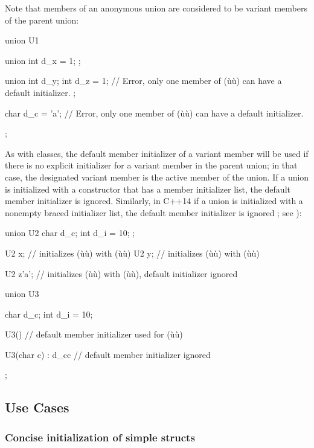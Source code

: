 Note that members of an anonymous union are considered to be variant
members of the parent union:

\begin{emcppslisting}
union U1
{
    union { int d_x = 1; };

    union
    {
        int d_y;
        int d_z = 1;
            // Error, only one member of (ù{}ù) can have a default initializer.
    };

    char d_c = 'a';
        // Error, only one member of (ù{}ù) can have a default initializer.
};
\end{emcppslisting}
    

As with classes, the default member initializer of a variant member will
be used if there is no explicit initializer for a variant member in the
parent union; in that case, the designated variant member is the active
member of the union. If a union is initialized with a constructor that
has a member initializer list, the default member initializer is
ignored. Similarly, in C++14 if a union is initialized with a nonempty braced
initializer list, the default member initializer is ignored ; see
):

\begin{emcppslisting}[emcppsstandards={c++14}]
union U2
{
    char d_c;
    int  d_i = 10;
};

U2 x;       // initializes (ù{}ù) with (ù{}ù)
U2 y{};     // initializes (ù{}ù) with (ù{}ù)

U2 z{'a'};  // initializes (ù{}ù) with (ù{}ù), default initializer ignored

union U3
{
   char d_c;
   int  d_i = 10;

   U3() { }                 // default member initializer used for (ù{}ù)

   U3(char c) : d_c{c} { }  // default member initializer ignored
};
\end{emcppslisting}
    

\subsection[Use Cases]{Use Cases}\label{use-cases}

\subsubsection[Concise initialization of simple \lstinline!struct!s]{Concise initialization of simple {\SubsubsecCode struct}s}\label{concise-initialization-of-simple-structs}

